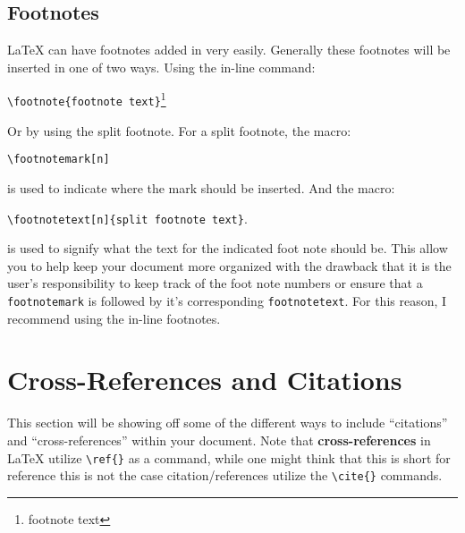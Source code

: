 		\subsection{Footnotes}
			\LaTeX{} can have footnotes added in very easily. 
			Generally these footnotes will be inserted in one of two ways.
			Using the in-line command:
			\begin{Center}
				\lstinline|\footnote{footnote text}|\footnote{footnote text} 
			\end{Center}
			Or by using the split footnote.
			For a split footnote, the macro:
			\begin{Center}
				\lstinline|\footnotemark[n]|\footnotemark{}
			\end{Center}
			is used to indicate where the mark should be inserted.
			And the macro: 
			\begin{Center}
				\lstinline|\footnotetext[n]{split footnote text}|.
			\end{Center}
			is used to signify what the text for the indicated foot note should be.
			This allow you to help keep your document more organized with the drawback that it is the user's responsibility to keep track of the foot note numbers or ensure that a \lstinline|footnotemark| is followed by it's corresponding \lstinline|footnotetext|.
			For this reason, I recommend using the in-line footnotes.
		
		
	\section{Cross-References and Citations}\label{sec:citref}
		This section will be showing off some of the different ways to include \enquote{citations} and \enquote{cross-references} within your document.
		Note that \textbf{cross-references} in \LaTeX{} utilize \lstinline|\ref{}| as a command, while one might think that this is short for reference this is not the case citation/references utilize the \lstinline|\cite{}| commands.
	  
